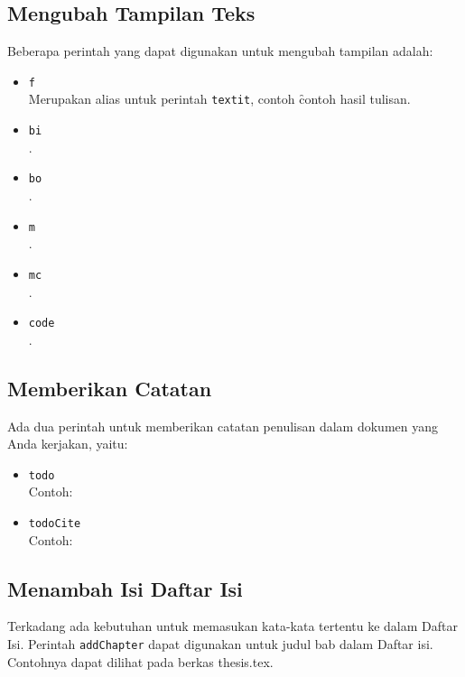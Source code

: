 \subsection{Mengubah Tampilan Teks}
Beberapa perintah yang dapat digunakan untuk mengubah tampilan adalah: 
\begin{itemize}
	\item \texttt{\bslash f} \\
		Merupakan alias untuk perintah \texttt{\bslash textit}, contoh 
		\f{contoh hasil tulisan}.
	\item \texttt{\bslash bi} \\
		.
	\item \texttt{\bslash bo} \\
		.
	\item \texttt{\bslash m} \\
		.
	\item \texttt{\bslash mc} \\
		.
	\item \texttt{\bslash code} \\ 
		.
\end{itemize}


\subsection{Memberikan Catatan}
Ada dua perintah untuk memberikan catatan penulisan dalam dokumen yang Anda 
kerjakan, yaitu: 
\begin{itemize}
	\item \texttt{\bslash todo} \\
		Contoh: \\ 
	\item \texttt{\bslash todoCite} \\ 
		Contoh: \todoCite
\end{itemize}


\subsection{Menambah Isi Daftar Isi}
Terkadang ada kebutuhan untuk memasukan kata-kata tertentu ke dalam Daftar Isi. 
Perintah \texttt{\bslash addChapter} dapat digunakan untuk judul bab dalam Daftar isi. 
Contohnya dapat dilihat pada berkas thesis.tex.


